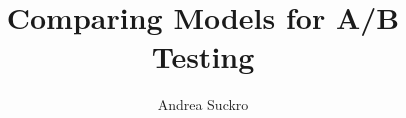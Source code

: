 \documentclass[11pt, oneside, openright, utf8, bachelor, english, subfiles]{base/thesis}
\institute{Institute of Cognitive Science}
\title{Comparing Models for A/B Testing}
\author{Andrea Suckro}
\begin{document}
\maketitle

\begin{abstract}

\end{abstract}


\tableofcontents

\mainpart






\appendix

\listoffigures
\listofalgorithms



\declaration
\end{document}
